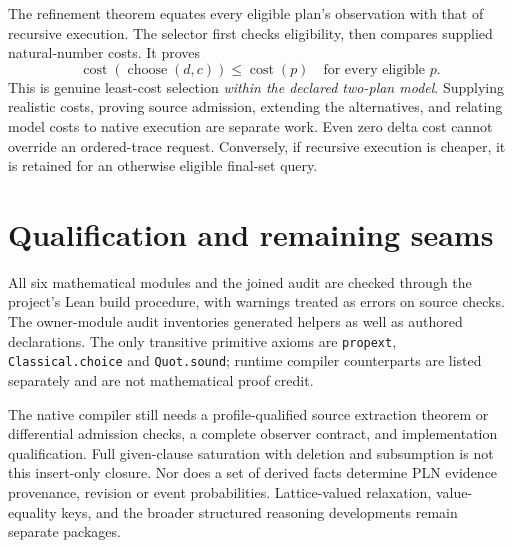 \documentclass[11pt,a4paper]{article}
\newcommand{\code}[1]{\nolinkurl{#1}}
\begin{document}
The refinement theorem equates every eligible plan's observation with that
of recursive execution. The selector first checks eligibility, then compares
supplied natural-number costs. It proves
\[
 \operatorname{cost}(\operatorname{choose}(d,c))
 \leq \operatorname{cost}(p)
 \quad\text{for every eligible }p.
\]
This is genuine least-cost selection \emph{within the declared two-plan model}.
Supplying realistic costs, proving source admission, extending the alternatives,
and relating model costs to native execution are separate work. Even zero
delta cost cannot override an ordered-trace request. Conversely, if recursive
execution is cheaper, it is retained for an otherwise eligible final-set query.

\section{Qualification and remaining seams}

All six mathematical modules and the joined audit are checked through the
project's Lean build procedure, with warnings treated as errors on source
checks. The owner-module audit inventories generated helpers as well as
authored declarations. The only transitive primitive axioms are
\code{propext}, \code{Classical.choice} and \code{Quot.sound}; runtime compiler
counterparts are listed separately and are not mathematical proof credit.

The native compiler still needs a profile-qualified source extraction
theorem or differential admission checks, a complete observer contract,
and implementation qualification. Full given-clause saturation with deletion
and subsumption is not this insert-only closure. Nor does a set of derived
facts determine PLN evidence provenance, revision or event probabilities.
Lattice-valued relaxation, value-equality keys, and the broader structured
reasoning developments remain separate packages.
\end{document}
